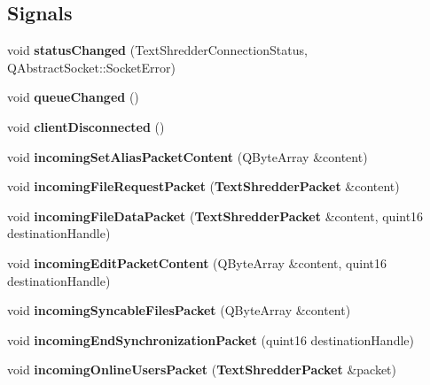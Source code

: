 \subsection*{Signals}
\begin{DoxyCompactItemize}
\item 
void {\bfseries statusChanged} (TextShredderConnectionStatus, QAbstractSocket::SocketError)\label{class_text_shredder_connection_aa6b9d6debcc65b64d75c13c5437a85dc}

\item 
void {\bfseries queueChanged} ()\label{class_text_shredder_connection_a462cfb59b4c2d365167e4e0b49481466}

\item 
void {\bfseries clientDisconnected} ()\label{class_text_shredder_connection_ab9185876682aed490112abed9d7177b0}

\item 
void {\bfseries incomingSetAliasPacketContent} (QByteArray \&content)\label{class_text_shredder_connection_a5bab096b78a0200272b355df17774504}

\item 
void {\bfseries incomingFileRequestPacket} ({\bf TextShredderPacket} \&content)\label{class_text_shredder_connection_a71da9c9395f7e10cb928f74542512c8b}

\item 
void {\bfseries incomingFileDataPacket} ({\bf TextShredderPacket} \&content, quint16 destinationHandle)\label{class_text_shredder_connection_a5db139b45701c13d32e75854d9542afc}

\item 
void {\bfseries incomingEditPacketContent} (QByteArray \&content, quint16 destinationHandle)\label{class_text_shredder_connection_a0a23f1de22dc51a867bd9aeed0b69a1f}

\item 
void {\bfseries incomingSyncableFilesPacket} (QByteArray \&content)\label{class_text_shredder_connection_a3b2c3340aa0bcb3cc3e19b9e4eb7b5ab}

\item 
void {\bfseries incomingEndSynchronizationPacket} (quint16 destinationHandle)\label{class_text_shredder_connection_aba8b7ccda944d149d7e007eaffe212c2}

\item 
void {\bfseries incomingOnlineUsersPacket} ({\bf TextShredderPacket} \&packet)\label{class_text_shredder_connection_a83008f283cbcd16afc74606a113eeea3}

\end{DoxyCompactItemize}
